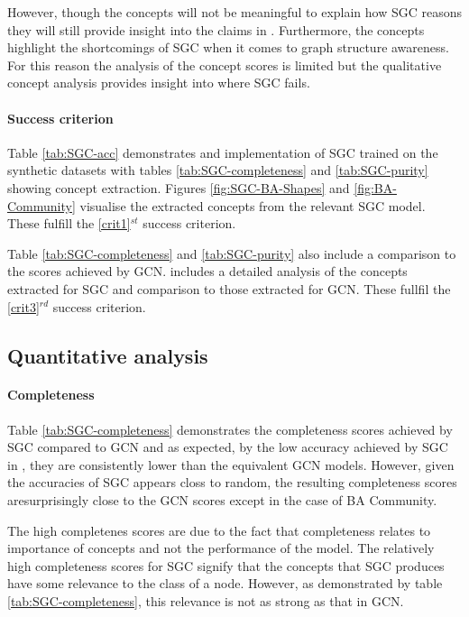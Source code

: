 However, though the concepts will not be meaningful to explain how SGC reasons they will still provide insight into the claims in .
Furthermore, the concepts highlight the shortcomings of SGC when it comes to graph structure awareness.
For this reason the analysis of the concept scores is limited but the qualitative concept analysis provides insight into where SGC fails.

\paragraph{Success criterion}
Table \ref{tab:SGC-acc} demonstrates and implementation of SGC trained on the synthetic datasets with tables \ref{tab:SGC-completeness} and \ref{tab:SGC-purity} showing concept extraction.
Figures \ref{fig:SGC-BA-Shapes} and \ref{fig:BA-Community} visualise the extracted concepts from the relevant SGC model. These fulfill the \ref{crit1}$^{st}$ success criterion.

Table \ref{tab:SGC-completeness} and \ref{tab:SGC-purity} also include a comparison to the scores achieved by GCN.
 includes a detailed analysis of the concepts extracted for SGC and comparison to those extracted for GCN.
These fullfil the \ref{crit3}$^{rd}$ success criterion.

\subsection{Quantitative analysis}
\label{sec:quant}
\paragraph{Completeness}


Table \ref{tab:SGC-completeness} demonstrates the completeness scores achieved by SGC compared to GCN and as expected, by the low accuracy achieved by SGC in , they are consistently lower than the equivalent GCN models.
However, given the accuracies of SGC appears closs to random, the resulting completeness scores aresurprisingly close to the GCN scores except in the case of BA Community.

The high completenes scores are due to the fact that completeness relates to importance of concepts and not the performance of the model.
The relatively high completeness scores for SGC signify that the concepts that SGC produces have some relevance to the class of a node.
However, as demonstrated by table \ref{tab:SGC-completeness}, this relevance is not as strong as that in GCN.

